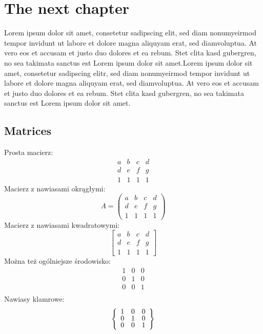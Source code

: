 \documentclass[a4paper,11pt,twoside]{report}
\theoremstyle{definition}
\begin{document}
\chapter{The next chapter}

Lorem ipsum dolor sit amet, consetetur sadipscing elit, sed diam nonumyeirmod tempor invidunt ut labore et dolore magna aliquyam erat, sed diamvoluptua. At vero eos et accusam et justo duo dolores et ea rebum. Stet clita kasd gubergren, no sea takimata sanctus est Lorem ipsum dolor sit amet.Lorem ipsum dolor sit amet, consetetur sadipscing elitr, sed diam nonumyeirmod tempor invidunt ut labore et dolore magna aliquyam erat, sed diamvoluptua. At vero eos et accusam et justo duo dolores et ea rebum. Stet clita kasd gubergren, no sea takimata sanctus est Lorem ipsum dolor sit amet.


\section{Matrices}

Prosta macierz:
\[
\begin{matrix}
a & b & c & d \\
d & e & f & g \\
1 & 1 & 1 & 1
\end{matrix}
\]
Macierz z nawiasami okrągłymi:
\[
A = 
\begin{pmatrix}
a & b & c & d \\
d & e & f & g \\
1 & 1 & 1 & 1
\end{pmatrix}
\]
Macierz z nawiasami kwadratowymi:
\[
\begin{bmatrix}
a & b & c & d \\
d & e & f & g \\
1 & 1 & 1 & 1
\end{bmatrix}
\]
Można też ogólniejsze środowisko:
\[
\renewcommand{\arraystretch}{0.8}
\begin{array}{ccc}
1 & 0 & 0 \\
0 & 1 & 0 \\
0 & 0 & 1 \\
\end{array}
\]
Nawiasy klamrowe:
\[
\left\{
\renewcommand{\arraystretch}{0.8}
\begin{array}{ccc}
1 & 0 & 0 \\
0 & 1 & 0 \\
0 & 0 & 1 \\
\end{array}\right\}
\]
\end{document}
